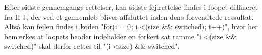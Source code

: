 \documentclass[11pt]{article}
\begin{document}
    Efter sidste gennemgangs rettelser, kan sidste fejlrettelse findes i loopet diffineret fra H-J, der ved et gennemløb bliver affsluttet inden dens forvendtede ressultat. Altså kan fejlen findes i koden "for(i = 0; i \textless (size \&\& switched); i++)", hvor her bemærkes at loopets header indeholder en forkert sat ramme "i \textless (size \&\& switched)" skal derfor rettes til "(i \textless size) \&\& switched".


    
\end{document}
